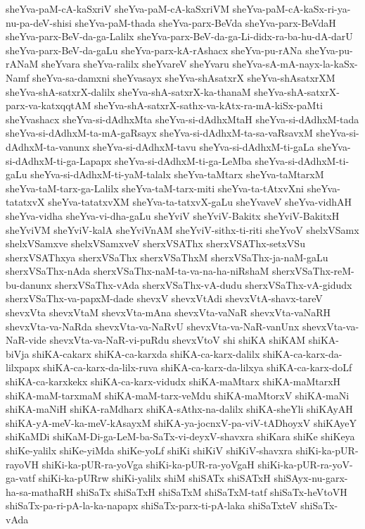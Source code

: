 {sheYva-paM-cA-kaSxriV
sheYva-paM-cA-kaSxriVM
sheYva-paM-cA-kaSx-ri-ya-nu-pa-deV-shisi
sheYva-paM-thada
sheYva-parx-BeVda
sheYva-parx-BeVdaH
sheYva-parx-BeV-da-ga-Lalilx
sheYva-parx-BeV-da-ga-Li-didx-ra-ba-hu-dA-darU
sheYva-parx-BeV-da-gaLu
sheYva-parx-kA-rAshacx
sheYva-pu-rANa
sheYva-pu-rANaM
sheYvara
sheYva-ralilx
sheYvareV
sheYvaru
sheYva-sA-mA-nayx-la-kaSx-Namf
sheYva-sa-damxni
sheYvasayx
sheYva-shAsatxrX
sheYva-shAsatxrXM
sheYva-shA-satxrX-dalilx
sheYva-shA-satxrX-ka-thanaM
sheYva-shA-satxrX-parx-va-katxqqtAM
sheYva-shA-satxrX-sathx-va-kAtx-ra-mA-kiSx-paMti
sheYvashacx
sheYva-si-dAdhxMta
sheYva-si-dAdhxMtaH
sheYva-si-dAdhxM-tada
sheYva-si-dAdhxM-ta-mA-gaRsayx
sheYva-si-dAdhxM-ta-sa-vaRsavxM
sheYva-si-dAdhxM-ta-vanunx
sheYva-si-dAdhxM-tavu
sheYva-si-dAdhxM-ti-gaLa
sheYva-si-dAdhxM-ti-ga-Lapapx
sheYva-si-dAdhxM-ti-ga-LeMba
sheYva-si-dAdhxM-ti-gaLu
sheYva-si-dAdhxM-ti-yaM-talalx
sheYva-taMtarx
sheYva-taMtarxM
sheYva-taM-tarx-ga-Lalilx
sheYva-taM-tarx-miti
sheYva-ta-tAtxvXni
sheYva-tatatxvX
sheYva-tatatxvXM
sheYva-ta-tatxvX-gaLu
sheYvaveV
sheYva-vidhAH
sheYva-vidha
sheYva-vi-dha-gaLu
sheYviV
sheYviV-Bakitx
sheYviV-BakitxH
sheYviVM
sheYviV-kalA
sheYviVnAM
sheYviV-sithx-ti-riti
sheYvoV
shelxVSamx
shelxVSamxve
shelxVSamxveV
sherxVSAThx
sherxVSAThx-setxVSu
sherxVSAThxya
sherxVSaThx
sherxVSaThxM
sherxVSaThx-ja-naM-gaLu
sherxVSaThx-nAda
sherxVSaThx-naM-ta-va-na-ha-niRshaM
sherxVSaThx-reM-bu-danunx
sherxVSaThx-vAda
sherxVSaThx-vA-dudu
sherxVSaThx-vA-gidudx
sherxVSaThx-va-papxM-dade
shevxV
shevxVtAdi
shevxVtA-shavx-tareV
shevxVta
shevxVtaM
shevxVta-mAna
shevxVta-vaNaR
shevxVta-vaNaRH
shevxVta-va-NaRda
shevxVta-va-NaRvU
shevxVta-va-NaR-vanUnx
shevxVta-va-NaR-vide
shevxVta-va-NaR-vi-puRdu
shevxVtoV
shi
shiKA
shiKAM
shiKA-biVja
shiKA-cakarx
shiKA-ca-karxda
shiKA-ca-karx-dalilx
shiKA-ca-karx-da-lilxpapx
shiKA-ca-karx-da-lilx-ruva
shiKA-ca-karx-da-lilxya
shiKA-ca-karx-doLf
shiKA-ca-karxkekx
shiKA-ca-karx-vidudx
shiKA-maMtarx
shiKA-maMtarxH
shiKA-maM-tarxmaM
shiKA-maM-tarx-veMdu
shiKA-maMtorxV
shiKA-maNi
shiKA-maNiH
shiKA-raMdharx
shiKA-sAthx-na-dalilx
shiKA-sheYli
shiKAyAH
shiKA-yA-meV-ka-meV-kAsayxM
shiKA-ya-jocnxV-pa-viV-tADhoyxV
shiKAyeY
shiKaMDi
shiKaM-Di-ga-LeM-ba-SaTx-vi-deyxV-shavxra
shiKara
shiKe
shiKeya
shiKe-yalilx
shiKe-yiMda
shiKe-yoLf
shiKi
shiKiV
shiKiV-shavxra
shiKi-ka-pUR-rayoVH
shiKi-ka-pUR-ra-yoVga
shiKi-ka-pUR-ra-yoVgaH
shiKi-ka-pUR-ra-yoV-ga-vatf
shiKi-ka-pURrw
shiKi-yalilx
shiM
shiSATx
shiSATxH
shiSAyx-nu-garx-ha-sa-mathaRH
shiSaTx
shiSaTxH
shiSaTxM
shiSaTxM-tatf
shiSaTx-heVtoVH
shiSaTx-pa-ri-pA-la-ka-napapx
shiSaTx-parx-ti-pA-laka
shiSaTxteV
shiSaTx-vAda
}
